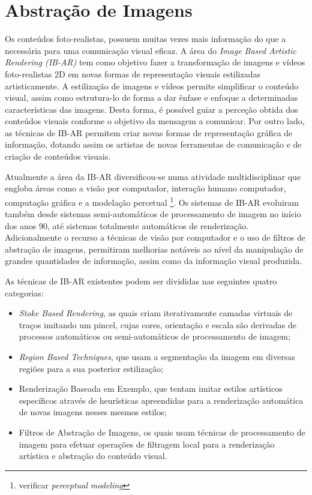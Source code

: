 \chapter{Abstração de Imagens} \label{chap:abstracao}

Os conteúdos foto-realistas, possuem muitas vezes mais informação do que a necessária para uma comunicação visual eficaz. A área do \textit{Image Based Artistic Rendering (IB-AR)} tem como objetivo fazer a transformação de imagens e vídeos foto-realistas 2D em novas formas de representação visuais estilizadas artisticamente. A estilização de imagens e vídeos permite simplificar o conteúdo visual, assim como estrutura-lo de forma a dar ênfase e enfoque a determinadas características das imagens. Desta forma, é possível guiar a perceção obtida dos conteúdos visuais conforme o objetivo da mensagem a comunicar. Por outro lado, as técnicas de IB-AR  permitem criar novas formas de representação gráfica de informação, dotando assim os artistas de novas ferramentas de comunicação e de criação de conteúdos visuais. 

Atualmente a área da IB-AR diversificou-se numa atividade multidisciplinar que engloba áreas como a visão por computador, interação humano computador, computação gráfica e a modelação percetual \footnote{verificar \textit{perceptual modeling}}. Os sistemas de IB-AR evoluiram também desde sistemas semi-automáticos de processamento de imagem no início dos anos 90, até sistemas totalmente automáticos de renderização. Adicionalmente o recurso a técnicas de visão por computador e o uso de filtros de abstração de imagens, permitiram melhorias notáveis ao nível da manipulação de grandes quantidades de informação, assim como da informação visual produzida.

As técnicas de IB-AR existentes podem ser divididas nas seguintes quatro categorias\cite{Kyprianidis2012}:
\begin{itemize}
\item \textit{Stoke Based Rendering}, as quais criam iterativamente camadas virtuais de traços imitando um pincel, cujas cores, orientação e escala são derivadas de processos automáticos ou semi-automáticos de processamento de imagem; 
\item \textit{Region Based Techniques}, que usam a segmentação da imagem em diversas regiões para a sua posterior estilização;
\item Renderização Baseada em Exemplo, que tentam imitar estilos artísticos específicos através de heurísticas apreendidas para a renderização automática de novas imagens nesses mesmos estilos;
\item Filtros de Abstração de Imagens, os quais usam técnicas de processamento de imagem para efetuar operações de filtragem local para a renderização artística e abstração  do conteúdo visual.
\end{itemize}

